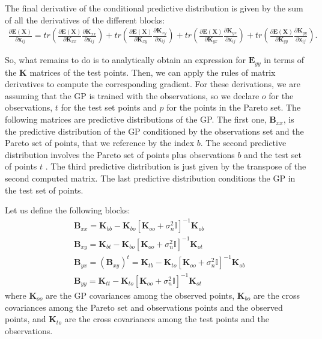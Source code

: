 The final derivative of the conditional predictive distribution is given by the sum of all the derivatives of the different blocks:
\begin{align}
\frac{\partial \mathbf{E}(\mathbf{X})}{\partial \mathbf{x}_{ij}} = tr(\frac{\partial \mathbf{E}(\mathbf{X})}{\partial \mathbf{K}_{xx}} \frac{\partial \mathbf{K}_{xx}}{\partial \mathbf{x}_{ij}}) + tr(\frac{\partial \mathbf{E}(\mathbf{X})}{\partial \mathbf{K}_{xy}} \frac{\partial \mathbf{K}_{xy}}{\partial \mathbf{x}_{ij}}) + tr(\frac{\partial \mathbf{E}(\mathbf{X})}{\partial \mathbf{K}_{yx}} \frac{\partial \mathbf{K}_{yx}}{\partial \mathbf{x}_{ij}}) + tr(\frac{\partial \mathbf{E}(\mathbf{X})}{\partial \mathbf{K}_{yy}} \frac{\partial \mathbf{K}_{yy}}{\partial \mathbf{x}_{ij}}).
\end{align}

So, what remains to do is to analytically obtain an expression for $\mathbf{E}_{yy}$ in terms of the $\mathbf{K}$ matrices of the test points. Then, we can apply the rules of matrix derivatives to compute the corresponding gradient. For these derivations, we are assuming that the GP is trained with the observations, so we declare $o$ for the observations, $t$ for the test set points and $p$ for the points in the Pareto set. The following matrices are predictive distributions of the GP. The first one, $\mathbf{B}_{xx}$, is the predictive distribution of the GP conditioned by the observations set and the Pareto set of points, that we reference by the index $b$. The second predictive distribution involves the Pareto set of points plus observations $b$ and the test set of points $t$ . The third predictive distribution is just given by the transpose of the second computed matrix. The last predictive distribution conditions the GP in the test set of points.

Let us define the following blocks:
\begin{align}
& \mathbf{B}_{xx} = \mathbf{K}_{bb} - \mathbf{K}_{bo}[\mathbf{K}_{oo}+\sigma_n^2\mathbb{I}]^{-1}\mathbf{K}_{ob} \\
& \mathbf{B}_{xy} = \mathbf{K}_{bt} - \mathbf{K}_{bo}[\mathbf{K}_{oo}+\sigma_n^2\mathbb{I}]^{-1}\mathbf{K}_{ot} \\
& \mathbf{B}_{yx} = (\mathbf{B}_{xy})^t = \mathbf{K}_{tb} - \mathbf{K}_{to}[\mathbf{K}_{oo}+\sigma_n^2\mathbb{I}]^{-1}\mathbf{K}_{ob}\\
& \mathbf{B}_{yy} = \mathbf{K}_{tt} - \mathbf{K}_{to}[\mathbf{K}_{oo}+\sigma_n^2\mathbb{I}]^{-1}\mathbf{K}_{ot} 
\end{align}
where $\mathbf{K}_{oo}$ are the GP covariances among the observed points, $\mathbf{K}_{bo}$ are the cross covariances
among the Pareto set and observations points and the observed points, and $\mathbf{K}_{to}$ are the cross covariances
among the test points and the observations.

